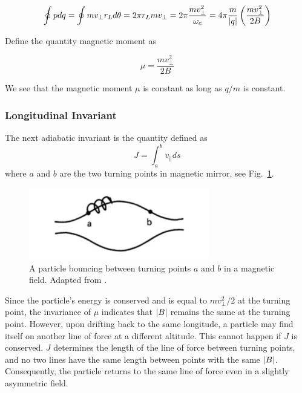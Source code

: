 \begin{equation}
	\oint pdq = \oint mv_\perp r_L d\theta = 2\pi r_L mv_\perp = 2\pi \frac{mv_\perp^2}{\omega_c} = 4\pi\frac{m}{\abs{q}}\left(\frac{mv_\perp^2}{2B}\right)
\end{equation}

Define the quantity magnetic moment as

\begin{equation}
	\mu = \frac{mv_\perp^2}{2B}
\end{equation}

We see that the magnetic moment $\mu$ is constant as long as $q/m$ is constant.

\subsubsection*{Longitudinal Invariant}
The next adiabatic invariant is the quantity defined as \cite{chen_introduction_2016}
\begin{equation}
	J=\int_a^b v_\parallel ds
\end{equation}
where $a$ and $b$ are the two turning points in magnetic mirror, see Fig.~\ref{fig:particle-in-mirror}.

\begin{figure}[htbp]
	\centering
	\includegraphics[width=0.7\textwidth]{figures/particle-in-mirror.png}
	\caption{A particle bouncing between turning points $a$ and $b$ in a magnetic field. Adapted from \cite{chen_introduction_2016}.}
	\label{fig:particle-in-mirror}
\end{figure}

Since the particle's energy is conserved and is equal to $mv_\perp^2/2$ at the turning point, the invariance of $\mu$ indicates that $\abs{B}$ remains the same at the turning point. However, upon drifting back to the same longitude, a particle may find itself on another line of force at a different altitude. This cannot happen if $J$ is conserved. $J$ determines the length of the line of force between turning points, and no two lines have the same length between points with the same $\abs{B}$. Consequently, the particle returns to the same line of force even in a slightly asymmetric field.


